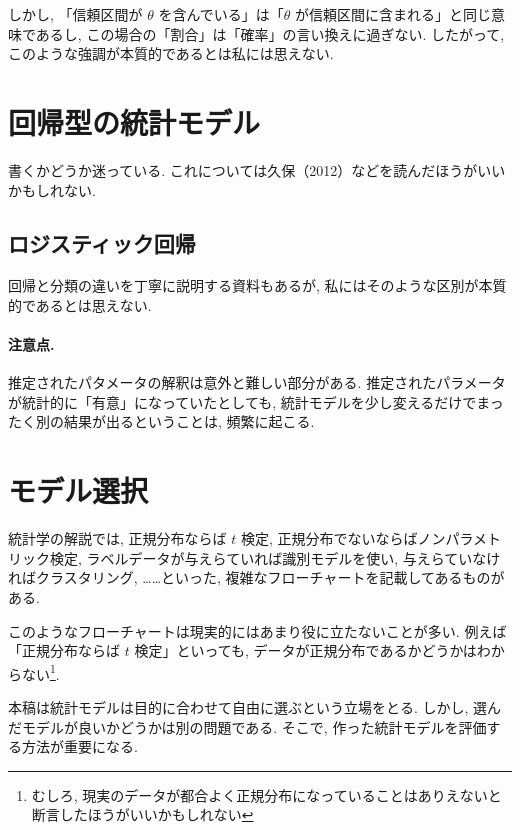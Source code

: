 \documentclass[a4paper, 12pt]{jarticle}
\begin{document}
しかし, 「信頼区間が $\theta$ を含んでいる」は「$\theta$ が信頼区間に含まれる」と同じ意味であるし, この場合の「割合」は「確率」の言い換えに過ぎない. したがって, このような強調が本質的であるとは私には思えない. 

\section{回帰型の統計モデル}

書くかどうか迷っている. これについては久保（2012）などを読んだほうがいいかもしれない.

\subsection{ロジスティック回帰}

回帰と分類の違いを丁寧に説明する資料もあるが, 私にはそのような区別が本質的であるとは思えない. 


\paragraph{注意点.} 推定されたパタメータの解釈は意外と難しい部分がある. 
推定されたパラメータが統計的に「有意」になっていたとしても, 統計モデルを少し変えるだけでまったく別の結果が出るということは, 頻繁に起こる. 

\section{モデル選択}

統計学の解説では, 正規分布ならば $t$ 検定, 正規分布でないならばノンパラメトリック検定, ラベルデータが与えらていれば識別モデルを使い, 与えらていなければクラスタリング, ……といった, 複雑なフローチャートを記載してあるものがある. 

このようなフローチャートは現実的にはあまり役に立たないことが多い. 例えば「正規分布ならば $t$ 検定」といっても, データが正規分布であるかどうかはわからない\footnote{むしろ, 現実のデータが都合よく正規分布になっていることはありえないと断言したほうがいいかもしれない}. 

本稿は統計モデルは目的に合わせて自由に選ぶという立場をとる. しかし, 選んだモデルが良いかどうかは別の問題である. 
そこで, 作った統計モデルを評価する方法が重要になる.
\end{document}
